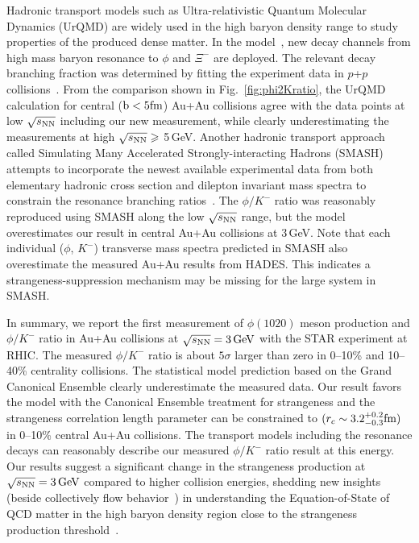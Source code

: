 \documentclass[%
 reprint,	
showpacs,
 amsmath,amssymb,
 aps,
 prc,
]{revtex4-1}
\begin{document}
Hadronic transport models such as Ultra-relativistic Quantum Molecular Dynamics (UrQMD) are widely used in the high baryon density range to study properties of the produced dense matter. In the model~\cite{Steinheimer_2015_UrQMD}, new decay channels from high mass baryon resonance to $\phi$ and $\Xi^-$ are deployed. The relevant decay branching fraction was determined by fitting the experiment data in $p$+$p$ collisions~\cite{ANKE_phi}. From the comparison shown in Fig.~\ref{fig:phi2Kratio}, the UrQMD calculation for central ($\rm{b}<5\rm{fm}$) Au+Au collisions agree with the data points at low ${\sqrt{s_{\rm NN}}}$ including our new measurement, while clearly underestimating the measurements at high $\sqrt{s_{\rm NN}}\geqslant$ 5\,GeV. Another hadronic transport approach called Simulating Many Accelerated Strongly-interacting Hadrons (SMASH) attempts to incorporate the newest available experimental data from both elementary hadronic cross section and dilepton invariant mass spectra to constrain the resonance branching ratios~\cite{Elfner_SMASH}. The $\phi/K^-$ ratio was reasonably reproduced using SMASH along the low ${\sqrt{s_{\rm NN}}}$ range, but the model overestimates our result in central Au+Au collisions at 3\,GeV. Note that each individual ($\phi$, $K^-$) transverse mass spectra predicted in SMASH also overestimate the measured Au+Au results from HADES.
This indicates a strangeness-suppression mechanism may be missing for the large system in SMASH.

In summary, we report the first measurement of $\phi(1020)$ meson production and $\phi/K^-$ ratio in Au+Au collisions at ${\sqrt{s_{\rm NN}} = \rm{3\,GeV}}$ with the STAR experiment at RHIC. The measured $\phi/K^-$ ratio is about $5\sigma$ larger than zero in 0--10\% and 10--40\% centrality collisions. The statistical model prediction based on the Grand Canonical Ensemble clearly underestimate the measured data. Our result favors the model with the Canonical Ensemble treatment for strangeness and the strangeness correlation length parameter can be constrained to $(r_c \sim 3.2_{-0.3}^{+0.2} \rm{fm})$ in 0--10\% central Au+Au collisions. The transport models including the resonance decays can reasonably describe our measured $\phi/K^-$ ratio result at this energy. Our results suggest a significant change in the strangeness production at ${\sqrt{s_{\rm NN}} = \rm{3\,GeV}}$ compared to higher collision energies, shedding new insights (beside collectively flow behavior~\cite{Danielewicz1592}) in understanding the Equation-of-State of QCD matter in the high baryon density region close to the strangeness production threshold~\cite{KO.PhysRevLett.55.2661,HADES.Ks2019457,CASSING.openCharm.2001753}. 
\end{document}
